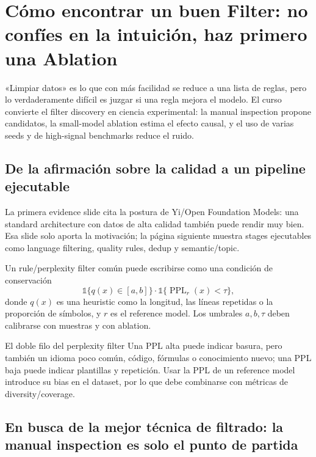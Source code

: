 \section{Cómo encontrar un buen Filter: no confíes en la intuición, haz primero una Ablation}

«Limpiar datos» es lo que con más facilidad se reduce a una lista de reglas, pero lo verdaderamente difícil es juzgar si una regla mejora el modelo. El curso convierte el filter discovery en ciencia experimental: la manual inspection propone candidatos, la small-model ablation estima el efecto causal, y el uso de varias seeds y de high-signal benchmarks reduce el ruido.

\subsection{De la afirmación sobre la calidad a un pipeline ejecutable}

La primera evidence slide cita la postura de Yi/Open Foundation Models: una standard architecture con datos de alta calidad también puede rendir muy bien. Esa slide solo aporta la motivación; la página siguiente muestra stages ejecutables como language filtering, quality rules, dedup y semantic/topic.



Un rule/perplexity filter común puede escribirse como una condición de conservación
\[
\mathbb{1}\{q(x)\in[a,b]\}\cdot \mathbb{1}\{\operatorname{PPL}_{r}(x)<\tau\},
\]
donde $q(x)$ es una heuristic como la longitud, las líneas repetidas o la proporción de símbolos, y $r$ es el reference model. Los umbrales $a,b,\tau$ deben calibrarse con muestras y con ablation.

\begin{warningbox}{El doble filo del perplexity filter}
Una PPL alta puede indicar basura, pero también un idioma poco común, código, fórmulas o conocimiento nuevo; una PPL baja puede indicar plantillas y repetición. Usar la PPL de un reference model introduce su bias en el dataset, por lo que debe combinarse con métricas de diversity/coverage.
\end{warningbox}

\subsection{En busca de la mejor técnica de filtrado: la manual inspection es solo el punto de partida}


